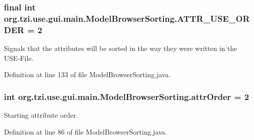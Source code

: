 \hypertarget{classorg_1_1tzi_1_1use_1_1gui_1_1main_1_1_model_browser_sorting_a5bb0f900f4a6680946bbcb500fa781e0}{
\subsubsection[{A\-T\-T\-R\-\_\-\-U\-S\-E\-\_\-\-O\-R\-D\-E\-R}]{\setlength{\rightskip}{0pt plus 5cm}final int org.\-tzi.\-use.\-gui.\-main.\-Model\-Browser\-Sorting.\-A\-T\-T\-R\-\_\-\-U\-S\-E\-\_\-\-O\-R\-D\-E\-R = 2\hspace{0.3cm}{\ttfamily [static]}}}\label{classorg_1_1tzi_1_1use_1_1gui_1_1main_1_1_model_browser_sorting_a5bb0f900f4a6680946bbcb500fa781e0}
Signals that the attributes will be sorted in the way they were written in the U\-S\-E-\/\-File. 

Definition at line 133 of file Model\-Browser\-Sorting.\-java.

\hypertarget{classorg_1_1tzi_1_1use_1_1gui_1_1main_1_1_model_browser_sorting_a34fecb61c83c05589692fee4edf699d0}{
\subsubsection[{attr\-Order}]{\setlength{\rightskip}{0pt plus 5cm}int org.\-tzi.\-use.\-gui.\-main.\-Model\-Browser\-Sorting.\-attr\-Order = 2}}\label{classorg_1_1tzi_1_1use_1_1gui_1_1main_1_1_model_browser_sorting_a34fecb61c83c05589692fee4edf699d0}
Starting attribute order. 

Definition at line 86 of file Model\-Browser\-Sorting.\-java.

